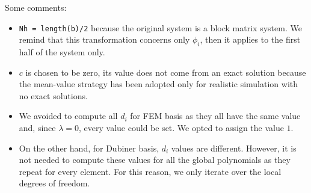 \documentclass[a4paper,11pt]{article}
\begin{document}
\noindent Some comments:
\begin{itemize}
	\item \texttt{Nh = length(b)/2} because the original system is a block matrix system. We remind that this transformation concerns only $\phi_i$, then it applies to the first half of the system only.
	\item $c$ is chosen to be zero, its value does not come from an exact solution because the mean-value strategy has been adopted only for realistic simulation with no exact solutions. 
	\item We avoided to compute all $d_i$ for FEM basis as they all have the same value and, since $\lambda=0$, every value could be set. We opted to assign  the value $1$.
	\item On the other hand, for Dubiner basis, $d_i$ values are different. However, it is not needed to compute these values for all the global polynomials as they repeat for every element. For this reason, we only iterate over the local degrees of freedom.
\end{itemize}

    \newpage
    \printbibliography
\end{document}
